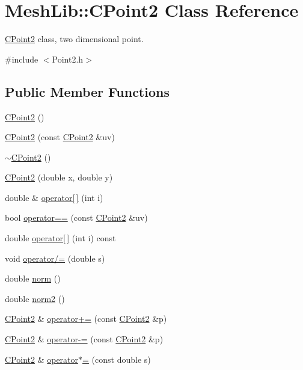 \hypertarget{class_mesh_lib_1_1_c_point2}{}\section{Mesh\+Lib\+:\+:C\+Point2 Class Reference}
\label{class_mesh_lib_1_1_c_point2}


\hyperlink{class_mesh_lib_1_1_c_point2}{C\+Point2} class, two dimensional point.  




{\ttfamily \#include $<$Point2.\+h$>$}

\subsection*{Public Member Functions}
\begin{DoxyCompactItemize}
\item 
\hyperlink{class_mesh_lib_1_1_c_point2_acb109d249116d10e4e71fe71ad1e7651}{C\+Point2} ()
\item 
\hyperlink{class_mesh_lib_1_1_c_point2_a842bebdfbc5ffd7a0e6ab242da004878}{C\+Point2} (const \hyperlink{class_mesh_lib_1_1_c_point2}{C\+Point2} \&uv)
\item 
\hyperlink{class_mesh_lib_1_1_c_point2_aad03e6146d7a2c956ed40b9fcb368bbe}{$\sim$\+C\+Point2} ()
\item 
\hyperlink{class_mesh_lib_1_1_c_point2_ab33fe7c817ef24ced6ac82c694286779}{C\+Point2} (double x, double y)
\item 
double \& \hyperlink{class_mesh_lib_1_1_c_point2_af7a4e532e9a4647c35e0debf08dd3d9b}{operator\mbox{[}$\,$\mbox{]}} (int i)
\item 
bool \hyperlink{class_mesh_lib_1_1_c_point2_a15a4bce72e3a1c0eed76e2036d3ef433}{operator==} (const \hyperlink{class_mesh_lib_1_1_c_point2}{C\+Point2} \&uv)
\item 
double \hyperlink{class_mesh_lib_1_1_c_point2_a7a7922953bbc869d80bfadd2da9f4e56}{operator\mbox{[}$\,$\mbox{]}} (int i) const 
\item 
void \hyperlink{class_mesh_lib_1_1_c_point2_abefd09b1dd956cfe0321d1f16c491012}{operator/=} (double s)
\item 
double \hyperlink{class_mesh_lib_1_1_c_point2_a2bed3422ed3b8a4db4bced80cb5d0b99}{norm} ()
\item 
double \hyperlink{class_mesh_lib_1_1_c_point2_af0c6714c1fcf439d4c049d28e4b73b42}{norm2} ()
\item 
\hyperlink{class_mesh_lib_1_1_c_point2}{C\+Point2} \& \hyperlink{class_mesh_lib_1_1_c_point2_a8a6607d9c0984471c3634bda1e81b360}{operator+=} (const \hyperlink{class_mesh_lib_1_1_c_point2}{C\+Point2} \&p)
\item 
\hyperlink{class_mesh_lib_1_1_c_point2}{C\+Point2} \& \hyperlink{class_mesh_lib_1_1_c_point2_a6c5faf4bafce013ba052de071d63fc6e}{operator-\/=} (const \hyperlink{class_mesh_lib_1_1_c_point2}{C\+Point2} \&p)
\item 
\hyperlink{class_mesh_lib_1_1_c_point2}{C\+Point2} \& \hyperlink{class_mesh_lib_1_1_c_point2_ae66a426acbf500ea5be4cfafa22c83f4}{operator$\ast$=} (const double s)
\end{DoxyCompactItemize}


